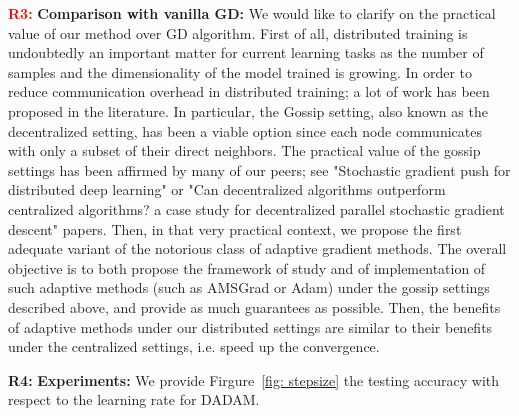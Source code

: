 \documentclass{article}
\begin{document}
\textbf{\textcolor{red}{R3:}}
\textbf{Comparison with vanilla GD:} 
We would like to clarify on the practical value of our method over GD algorithm.
First of all, distributed training is undoubtedly an important matter for current learning tasks as the number of samples and the dimensionality of the model trained is growing. In order to reduce communication overhead in distributed training; a lot of work has been proposed in the literature. In particular, the Gossip setting, also known as the decentralized setting, has been a viable option since each node communicates with only a subset of their direct neighbors. The practical value of the gossip settings has been affirmed by many of our peers; see "Stochastic gradient push for distributed deep learning" or "Can decentralized algorithms outperform centralized algorithms? a case study for decentralized parallel stochastic gradient descent" papers.
Then, in that very practical context, we propose the first adequate variant of the notorious class of adaptive gradient methods. The overall objective is to both propose the framework of study and of implementation of such adaptive methods (such as AMSGrad or Adam) under the gossip settings described above, and provide as much guarantees as possible. 
Then, the benefits of adaptive methods under our distributed settings are similar to their benefits under the centralized settings, i.e. speed up the convergence.

\vspace{0.01in}
\textbf{\textcolor{green!50!black}{R4:}}
\textbf{Experiments:} 
We provide Firgure~\ref{fig: stepsize} the testing accuracy with respect to the learning rate for DADAM.
\end{document}

